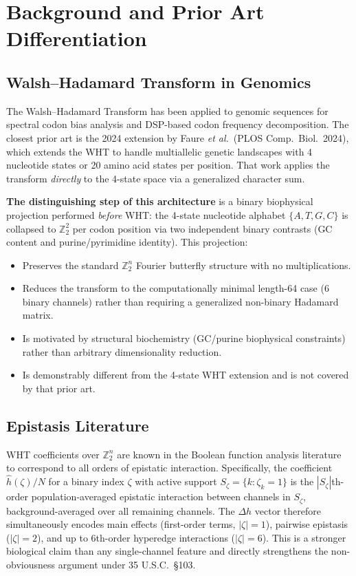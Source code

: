 \documentclass[12pt,letterpaper]{article}
\theoremstyle{definition}
\theoremstyle{plain}
\theoremstyle{remark}
\newcommand{\hhat}{\hat{h}}
\begin{document}
\section{Background and Prior Art Differentiation}

\subsection{Walsh--Hadamard Transform in Genomics}

The Walsh--Hadamard Transform has been applied to genomic sequences for spectral codon bias analysis and DSP-based codon frequency decomposition. The closest prior art is the 2024 extension by Faure \emph{et al.}\ (PLOS Comp.\ Biol.\ 2024), which extends the WHT to handle multiallelic genetic landscapes with 4 nucleotide states or 20 amino acid states per position. That work applies the transform \emph{directly} to the 4-state space via a generalized character sum.

\textbf{The distinguishing step of this architecture} is a binary biophysical projection performed \emph{before} WHT: the 4-state nucleotide alphabet $\{A, T, G, C\}$ is collapsed to $\mathbb{Z}_2^2$ per codon position via two independent binary contrasts (GC content and purine/pyrimidine identity). This projection:
\begin{itemize}
  \item Preserves the standard $\mathbb{Z}_2^n$ Fourier butterfly structure with no multiplications.
  \item Reduces the transform to the computationally minimal length-64 case (6 binary channels) rather than requiring a generalized non-binary Hadamard matrix.
  \item Is motivated by structural biochemistry (GC/purine biophysical constraints) rather than arbitrary dimensionality reduction.
  \item Is demonstrably different from the 4-state WHT extension and is not covered by that prior art.
\end{itemize}

\subsection{Epistasis Literature}

WHT coefficients over $\mathbb{Z}_2^n$ are known in the Boolean function analysis literature to correspond to all orders of epistatic interaction. Specifically, the coefficient $\hhat(\zeta)/N$ for a binary index $\zeta$ with active support $S_\zeta = \{k : \zeta_k = 1\}$ is the $|S_\zeta|$th-order population-averaged epistatic interaction between channels in $S_\zeta$, background-averaged over all remaining channels. The $\Delta h$ vector therefore simultaneously encodes main effects (first-order terms, $|\zeta|=1$), pairwise epistasis ($|\zeta|=2$), and up to 6th-order hyperedge interactions ($|\zeta|=6$). This is a stronger biological claim than any single-channel feature and directly strengthens the non-obviousness argument under 35 U.S.C.\ \S 103.
\end{document}
